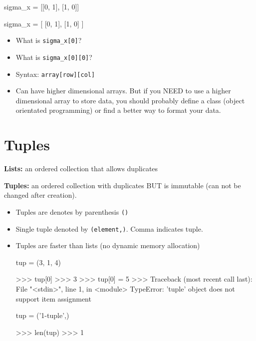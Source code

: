 \documentclass[12pt]{article}
\numberwithin{equation}{section}
\begin{document}
\begin{python}
sigma_x = [[0, 1], [1, 0]]

sigma_x = [ [0, 1], 
            [1, 0] ]
\end{python}

\begin{itemize}
    \item What is \verb|sigma_x[0]|?
    \item What is \verb|sigma_x[0][0]|?
    \item Syntax: \verb|array[row][col]|
    \item Can have higher dimensional arrays. But if you NEED to use a higher dimensional array to store data, you should probably define a class (object orientated programming) or find a better way to format your data.
\end{itemize}

\section{Tuples}
\textbf{Lists:} an ordered collection that allows duplicates

\textbf{Tuples:} an ordered collection with duplicates BUT is immutable (can not be changed after creation).
\begin{itemize}
    \item Tuples are denotes by parenthesis \verb|()|
    \item Single tuple denoted by \verb|(element,)|. Comma indicates tuple.
    \item Tuples are faster than lists (no dynamic memory allocation)
    \begin{python}
    tup = (3, 1, 4)
    
    >>> tup[0]
    >>> 3
    >>> tup[0] = 5
    >>> Traceback (most recent call last):
    File "<stdin>", line 1, in <module>
    TypeError: 'tuple' object does not support item assignment
    
    tup = ('1-tuple',)
    
    >>> len(tup)
    >>> 1
    \end{python}
\end{itemize}
\end{document}
